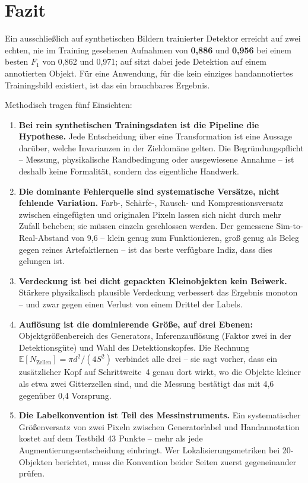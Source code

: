 \section{Fazit}

Ein ausschließlich auf synthetischen Bildern trainierter Detektor erreicht auf
zwei echten, nie im Training gesehenen Aufnahmen \mAPfifty{} von \textbf{0,886}
und \textbf{0,956} bei einem besten $F_1$ von 0,862 und 0,971; auf 
sitzt dabei jede Detektion auf einem annotierten Objekt. Für eine Anwendung, für die kein einziges
handannotiertes Trainingsbild existiert, ist das ein brauchbares Ergebnis.

Methodisch tragen fünf Einsichten:

\begin{enumerate}[itemsep=2pt]
  \item \textbf{Bei rein synthetischen Trainingsdaten ist die Pipeline die
  Hypothese.} Jede Entscheidung über eine Transformation ist eine Aussage
  darüber, welche Invarianzen in der Zieldomäne gelten. Die Begründungspflicht --
  Messung, physikalische Randbedingung oder ausgewiesene Annahme -- ist deshalb
  keine Formalität, sondern das eigentliche Handwerk.
  \item \textbf{Die dominante Fehlerquelle sind systematische Versätze, nicht
  fehlende Variation.} Farb-, Schärfe-, Rausch- und Kompressionsversatz zwischen
  eingefügten und originalen Pixeln lassen sich nicht durch mehr Zufall beheben;
  sie müssen einzeln geschlossen werden. Der gemessene Sim-to-Real-Abstand von
  9,6\PP{} -- klein genug zum Funktionieren, groß genug als Beleg gegen reines
  Artefaktlernen -- ist das beste verfügbare Indiz, dass dies gelungen ist.
  \item \textbf{Verdeckung ist bei dicht gepackten Kleinobjekten kein Beiwerk.}
  Stärkere physikalisch plausible Verdeckung verbessert das Ergebnis monoton --
  und zwar gegen einen Verlust von einem Drittel der Labels.
  \item \textbf{Auflösung ist die dominierende Größe, auf drei Ebenen:}
  Objektgrößenbereich des Generators, Inferenzauflösung (Faktor zwei in der
  Detektionsgüte) und Wahl des Detektionskopfes. Die Rechnung
  $\mathbb{E}[N_{\text{Zellen}}] = \pi d^2/(4S^2)$ verbindet alle drei -- sie sagt
  vorher, dass ein zusätzlicher Kopf auf Schrittweite~4 genau dort wirkt, wo die
  Objekte kleiner als etwa zwei Gitterzellen sind, und die Messung bestätigt das
  mit 4,6 gegenüber 0,4\PP{} Vorsprung.
  \item \textbf{Die Labelkonvention ist Teil des Messinstruments.} Ein
  systematischer Größenversatz von zwei Pixeln zwischen Generatorlabel und
  Handannotation kostet auf dem Testbild 43 Punkte \mAPseven{} -- mehr als jede
  Augmentierungsentscheidung einbringt. Wer Lokalisierungsmetriken bei
  20\px-Objekten berichtet, muss die Konvention beider Seiten zuerst
  gegeneinander prüfen.
\end{enumerate}
